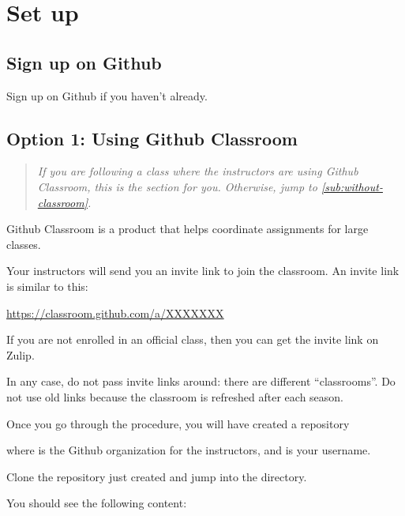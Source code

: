 \section{Set up}

\subsection{Sign up on Github}

Sign up on Github if you haven't already.

\subsection{Option 1: Using Github Classroom}\label{subsec:with-classroom}

\begin{quote}
  \emph{
    If you are following a class where the instructors are using Github Classroom,
    this is the section for you. Otherwise, jump to \cref{sub:without-classroom}.}
\end{quote}

Github Classroom is a product that helps coordinate assignments for large classes.

Your instructors will send you an invite link to join the classroom. An invite link is similar to this:

\url{https://classroom.github.com/a/XXXXXXX}

If you are not enrolled in an official class, then you can get the invite link on Zulip.

In any case, do not pass invite links around: there are different ``classrooms''.
Do not use old links because the classroom is refreshed after each season.

Once you go through the procedure, you will have created a repository

\begin{quote}
\end{quote}
where  is the Github organization for the instructors, and  is your username.

Clone the repository just created and jump into the directory.

You should see the following content:
%
%


